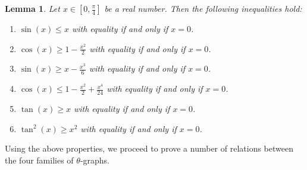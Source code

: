 \documentclass[12pt]{article}
\newtheorem{lem}[defin]{Lemma}
\newenvironment{lemma}{\begin{lem} \sl}{\end{lem}}
\begin{document}
\begin{lemma}
\label{lemma trigonometric inequalities}
  Let $x \in \left[0,\frac{\pi}{4}\right]$ be a real number. Then the following inequalities hold:
  \begin{enumerate}
    \item \label{lemma trigonometric inequalities item sin <}
    $\sin(x) \leq x$ with equality if and only if $x=0$.

    \item \label{lemma trigonometric inequalities item cos >}
    $\cos(x) \geq 1-\frac{x^2}{2}$ with equality if and only if $x=0$.

    \item \label{lemma trigonometric inequalities item sin >}
    $\sin(x) \geq x-\frac{x^3}{6}$ with equality if and only if $x=0$.

    \item \label{lemma trigonometric inequalities item cos <}
    $\cos(x) \leq 1-\frac{x^2}{2}+\frac{x^4}{24}$ with equality if and only if $x=0$.

    \item \label{lemma trigonometric inequalities item tan >}
    $\tan(x) \geq x$ with equality if and only if $x=0$.

    \item \label{lemma trigonometric inequalities item tan^2 >}
    $\tan^2\!(x) \geq x^2$ with equality if and only if $x=0$.
  \end{enumerate}
\end{lemma}


Using the above properties, we proceed to prove a number of relations between the four families of $\theta$-graphs. 

\setcounter{equation}{0}
\renewcommand{\theequation}{\alph{equation}}
\end{document}
